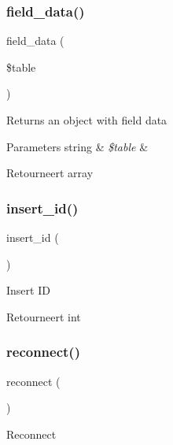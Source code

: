 \subsubsection{\texorpdfstring{field\_data()}{field\_data()}}
{\footnotesize\ttfamily field\+\_\+data (\begin{DoxyParamCaption}\item[{}]{\$table }\end{DoxyParamCaption})}

Returns an object with field data


\begin{DoxyParams}[1]{Parameters}
string & {\em \$table} & \\
\hline
\end{DoxyParams}
\begin{DoxyReturn}{Retourneert}
array 
\end{DoxyReturn}
\mbox{\label{class_c_i___d_b__mysql__driver_a933f2cde8dc7f87875e257d0a4902e99}} 
\subsubsection{\texorpdfstring{insert\_id()}{insert\_id()}}
{\footnotesize\ttfamily insert\+\_\+id (\begin{DoxyParamCaption}{ }\end{DoxyParamCaption})}

Insert ID

\begin{DoxyReturn}{Retourneert}
int 
\end{DoxyReturn}
\mbox{\label{class_c_i___d_b__mysql__driver_a57c19c642ab3023e28d10c50f86ff0a8}} 
\subsubsection{\texorpdfstring{reconnect()}{reconnect()}}
{\footnotesize\ttfamily reconnect (\begin{DoxyParamCaption}{ }\end{DoxyParamCaption})}

Reconnect

